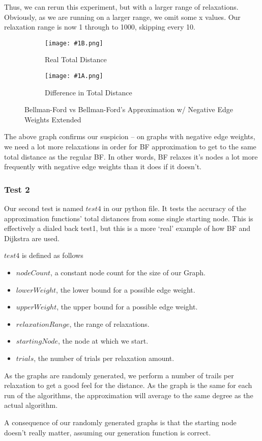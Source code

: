 \documentclass{article}
\newcommand{\expOneTestOneFigure}[2]
{
    \begin{figure}[ht!]
        \begin{subfigure}[t]{.48\textwidth}
            \centering
            \texttt{[image: \#1B.png]}
            \caption{Real Total Distance}
        \end{subfigure}\hfill
        \begin{subfigure}[t]{.48\textwidth}
            \centering
            \texttt{[image: \#1A.png]}
            \caption{Difference in Total Distance}
        \end{subfigure}
    \caption{#2}
    \end{figure}
}
\begin{document}
Thus, we can rerun this experiment, but with a larger range of relaxations. Obviously, as we are running on a larger range, we omit some x values. Our relaxation range is now 1 through to 1000, skipping every 10.

\FloatBarrier{}
\expOneTestOneFigure{images/part1/exp1_1d}{Bellman-Ford vs Bellman-Ford's Approximation w/ Negative Edge Weights Extended}
\FloatBarrier{}

The above graph confirms our suspicion -- on graphs with negative edge weights, we need a lot more relaxations in order for BF approximation to get to the same total distance as the regular BF. In other words, BF relaxes it's nodes a lot more frequently with negative edge weights than it does if it doesn't.

\newpage
\subsubsection{Test 2}

Our second test is named $test4$ in our python file. It tests the accuracy of the approximation functions' total distances from some single starting node. This is effectively a dialed back test1, but this is a more `real' example of how BF and Dijkstra are used.

$test4$ is defined as follows
\begin{itemize}
    \item $nodeCount$, a constant node count for the size of our Graph.
    \item $lowerWeight$, the lower bound for a possible edge weight.
    \item $upperWeight$, the upper bound for a possible edge weight.
    \item $relaxationRange$, the range of relaxations.
    \item $startingNode$, the node at which we start.
    \item $trials$, the number of trials per relaxation amount.
\end{itemize}

As the graphs are randomly generated, we perform a number of trails per relaxation to get a good feel for the distance. As the graph is the same for each run of the algorithms, the approximation will average to the same degree as the actual algorithm. 

A consequence of our randomly generated graphs is that the starting node doesn't really matter, assuming our generation function is correct.
\end{document}
